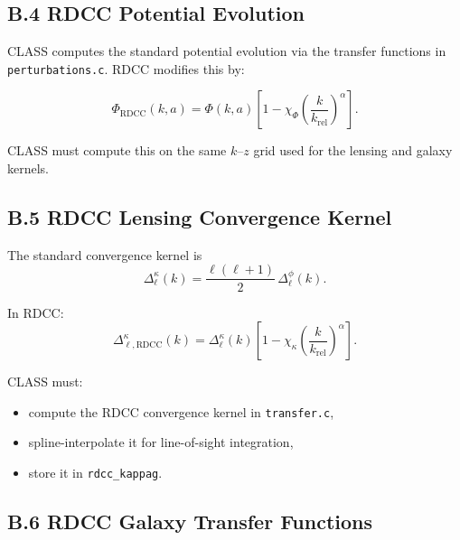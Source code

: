 \documentclass[11pt,a4paper]{article}
\begin{document}
\subsection*{B.4 RDCC Potential Evolution}

CLASS computes the standard potential evolution via the transfer functions in 
\texttt{perturbations.c}. RDCC modifies this by:

\begin{equation}
    \Phi_{\mathrm{RDCC}}(k,a)
    = \Phi(k,a)
      \left[
        1 - \chi_{\Phi}
        \left(\frac{k}{k_{\mathrm{rel}}}\right)^{\alpha}
      \right].
\end{equation}

CLASS must compute this on the same $k$–$z$ grid used for the lensing and galaxy kernels.

\subsection*{B.5 RDCC Lensing Convergence Kernel}

The standard convergence kernel is
\begin{equation}
    \Delta_{\ell}^{\kappa}(k)
    = \frac{\ell(\ell+1)}{2}\,
      \Delta_{\ell}^{\phi}(k).
\end{equation}

In RDCC:
\begin{equation}
    \Delta_{\ell,\mathrm{RDCC}}^{\kappa}(k)
    = \Delta_{\ell}^{\kappa}(k)
      \left[
        1 - \chi_{\kappa}
        \left(\frac{k}{k_{\mathrm{rel}}}\right)^{\alpha}
      \right].
\end{equation}

CLASS must:

\begin{itemize}
    \item compute the RDCC convergence kernel in \texttt{transfer.c},
    \item spline-interpolate it for line-of-sight integration,
    \item store it in \texttt{rdcc\_kappag}.
\end{itemize}

\subsection*{B.6 RDCC Galaxy Transfer Functions}
\end{document}
